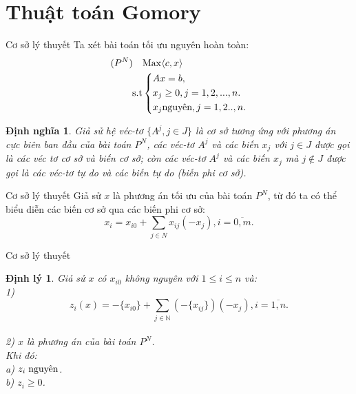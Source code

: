 \documentclass[10pt]{beamer}
\newtheorem{dn}{Định nghĩa}[section]
\newtheorem{dl}{Định lý}[section]
\begin{document}
\section*{Thuật toán Gomory}
    \begin{frame}{Cơ sở lý thuyết}
        Ta xét bài toán tối ưu nguyên hoàn toàn:\\
\begin{equation}\label{Gomory1}
     \begin{split}
      (P^N) \quad    & {\rm{Max}} \langle c,x \rangle\\
          \rm{s.t} &\left\{\begin{split}
            & Ax= b,\\
           & x_j \ge 0, j=1,2,...,n.\\
            & x_j \text{nguyên}, j=1,2..,n.\\
           \end{split}\right.
       \end{split}
   \end{equation}
   \begin{dn}
     Giả  sử hệ véc-tơ $\{A^j,j\in J\}$ là cơ sở tương ứng với phương án cực biên ban đầu của bài toán $P^N$, các véc-tơ $A^j$ và các biến $x_j$ với $j\in J$ được gọi là các véc tơ cơ sở và biến cơ sở; còn các véc-tơ $A^j$ và các biến $x_j$ mà $j \notin J$ được gọi là các véc-tơ tự do và các biến tự do (biến phi cơ sở).\\  
   \end{dn}
    \end{frame}

    \begin{frame}{Cơ sở lý thuyết}
         Giả sử $x$ là phương án  tối ưu của bài toán $P^N$, từ đó ta có thể biểu diễn các biến cơ sở qua các biến phi cơ sở:\\
   \begin{equation}\label{2.4}
       x_{i}=x_{i0} + \sum_{j \in N} x_{ij}(-x_j), i=\overline{0,m}.
   \end{equation}
    \end{frame}

    \begin{frame}{Cơ sở lý thuyết}
        \begin{dl}
        Giả sử $x$ có $x_{i0}$ không nguyên với $1\le i\le n$ và:\\
        1)\begin{equation}\label{2.5}
            z_i(x)= -\{x_{i0}\} + \sum_{j \in \mathbb {N} }(-\{x_{ij}\})(-x_{j}), i=\overline{1,n}.
        \end{equation} \\
        2) $x$ là phương án của bài toán $P^N$.\\
        Khi đó:\\
        a) $z_i \hspace{0.1cm} \text{nguyên}$.\\
        b) $z_i \ge 0$. 
        \end{dl}
    \end{frame}
\end{document}
